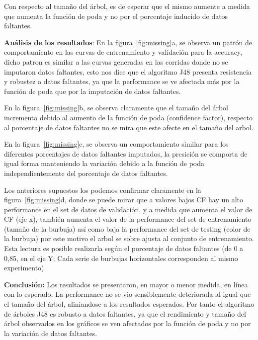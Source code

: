 Con respecto al tamaño del árbol, es de esperar que el mismo aumente
a medida que aumenta la función de poda y no por el porcentaje inducido de datos faltantes. 

\textbf{Análisis de los resultados}: En la figura~\ref{fig:missing}a,
se observa un patrón de comportamiento en las curvas de entrenamiento y validación para la accuracy,
dicho patron es similar a las curvas generadas en las corridas donde no se imputaron datos faltantes,
esto nos dice que el algoritmo J48 presenta resistencia y robustez a datos faltantes, 
ya que la performance se ve afectada más por la función de poda que por la imputación de datos faltantes.

En la figura~\ref{fig:missing}b, 
se observa claramente que el tamaño del árbol  incrementa debido al aumento de la función de poda 
(confidence factor), respecto al porcentaje de datos faltantes no se mira que este afecte en el tamaño del arbol.

En la figura~\ref{fig:missing}c, se observa un comportamiento similar
para los diferentes porcentajes de datos faltantes imputados,  la presición se comporta de igual forma manteniendo
la variación debido a la función de poda independientemente del porcentaje de datos faltantes.

Los anteriores supuestos los podemos confirmar claramente en la figura~\ref{fig:missing}d,
donde se puede mirar que a valores bajos CF hay un alto performance en el set de datos de validación, y a
medida que aumenta el valor de CF (eje x), también aumenta el valor de la performance del set de entrenamiento (tamaño
de la burbuja) así como baja la performance del set de testing (color de la burbuja) por este motivo el arbol se sobre ajusta
al conjunto de entrenamiento. 
Esta lectura es posible realizarla según el porcentaje de datos faltantes (de 0 a 0,85, en el eje Y; Cada serie de burbujas horizontales
corresponden al mismo experimento).

\textbf{Conclusión:} Los resultados se presentaron, en mayor o menor medida, en línea con lo esperado. La performance no 
se vio sensiblemente deteriorada al igual que el tamaño del árbol, aliniandose a los resultados esperados. 
Por tanto  el algoritmo de árboles J48 es robusto a datos faltantes,
ya que el rendimiento y  tamaño del árbol observados en los gráficos  se ven afectados por la función de poda y no por la
variación de datos faltantes.


